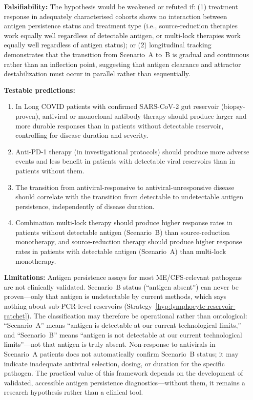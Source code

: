 \begin{hypothesis}
\textbf{Falsifiability:} The hypothesis would be weakened or refuted if: (1) treatment response in adequately characterised cohorts shows no interaction between antigen persistence status and treatment type (i.e., source-reduction therapies work equally well regardless of detectable antigen, or multi-lock therapies work equally well regardless of antigen status); or (2) longitudinal tracking demonstrates that the transition from Scenario~A to~B is gradual and continuous rather than an inflection point, suggesting that antigen clearance and attractor destabilization must occur in parallel rather than sequentially.

\textbf{Testable predictions:}
\begin{enumerate}
    \item In Long COVID patients with confirmed SARS-CoV-2 gut reservoir (biopsy-proven), antiviral or monoclonal antibody therapy should produce larger and more durable responses than in patients without detectable reservoir, controlling for disease duration and severity.
    \item Anti-PD-1 therapy (in investigational protocols) should produce more adverse events and less benefit in patients with detectable viral reservoirs than in patients without them.
    \item The transition from antiviral-responsive to antiviral-unresponsive disease should correlate with the transition from detectable to undetectable antigen persistence, independently of disease duration.
    \item Combination multi-lock therapy should produce higher response rates in patients without detectable antigen (Scenario~B) than source-reduction monotherapy, and source-reduction therapy should produce higher response rates in patients with detectable antigen (Scenario~A) than multi-lock monotherapy.
\end{enumerate}

\textbf{Limitations:} Antigen persistence assays for most ME/CFS-relevant pathogens are not clinically validated. Scenario~B status (``antigen absent'') can never be proven---only that antigen is undetectable by current methods, which says nothing about sub-PCR-level reservoirs (Strategy~\ref{hyp:lymphocyte-reservoir-ratchet}). The classification may therefore be operational rather than ontological: ``Scenario~A'' means ``antigen is detectable at our current technological limits,'' and ``Scenario~B'' means ``antigen is not detectable at our current technological limits''---not that antigen is truly absent. Non-response to antivirals in Scenario~A patients does not automatically confirm Scenario~B status; it may indicate inadequate antiviral selection, dosing, or duration for the specific pathogen. The practical value of this framework depends on the development of validated, accessible antigen persistence diagnostics---without them, it remains a research hypothesis rather than a clinical tool.
\end{hypothesis}

